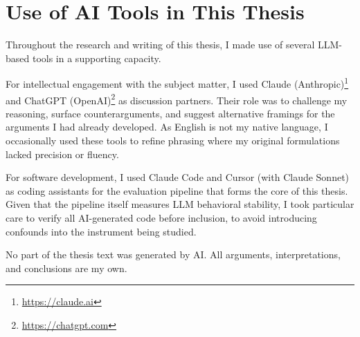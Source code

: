 \documentclass[11pt,
  paper=a4,
  bibliography=totocnumbered,
  captions=tableheading,
  BCOR=10mm
]{scrreprt}
\begin{document}
\chapter*{Use of AI Tools in This Thesis}

Throughout the research and writing of this thesis,
I made use of several LLM-based tools in a supporting capacity.

For intellectual engagement with the subject matter,
I used Claude (Anthropic)\footnote{\href{https://claude.ai}{https://claude.ai}} and ChatGPT (OpenAI)\footnote{\href{https://chatgpt.com}{https://chatgpt.com}} as discussion partners.
Their role was to challenge my reasoning, surface counterarguments, and suggest alternative framings for the arguments I had already developed.
As English is not my native language, I occasionally used these tools to refine phrasing where my original formulations lacked precision or fluency.

For software development, I used Claude Code and Cursor (with Claude Sonnet) as coding assistants for the evaluation pipeline that forms the core of this thesis.
Given that the pipeline itself measures LLM behavioral stability, I took particular care to verify all AI-generated code before inclusion, to avoid introducing confounds into the instrument being studied.

No part of the thesis text was generated by AI.
All arguments, interpretations, and conclusions are my own.


\glsaddall
\printglossaries
\printbibliography


\appendix

\end{document}

